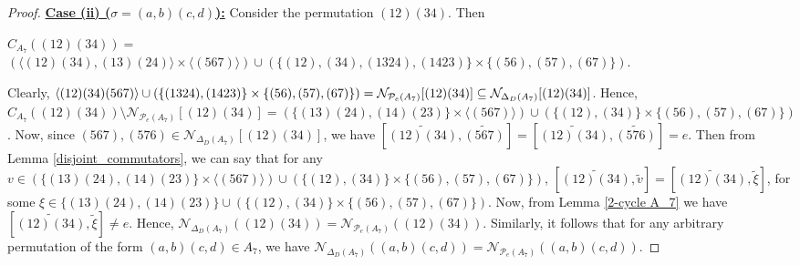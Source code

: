 \documentclass[10pt,a4paper]{amsart}
\begin{document}
\begin{proof}
\vspace{.3cm}
\noindent\underline{\bf{Case (ii) ($\sigma=(a,b)(c,d)$):}} Consider the permutation $(12)(34)$. Then
\begin{center}
$C_{A_7}((12)(34))=$\\
$(\langle (12)(34),(13)(24)\rangle\times\langle (567)\rangle)\cup(\{(12),(34),(1324),(1423)\}\times\{(56),(57),(67)\}).$   
\end{center}
\vspace{.15cm}
Clearly, $\langle(12)(34)(567)\rangle\cup(\{(1324),(1423)\}\times\{(56),(57),(67)\})=\mathcal{N}_{\mathcal{P}_e(A_7)}[(12)(34)]\subseteq \\ \mathcal{N}_{\Delta_D(A_7)}[(12)(34)]$. Hence, $C_{A_7}((12)(34))\setminus\mathcal{N}_{\mathcal{P}_e(A_7)}[(12)(34)]=(\{(13)(24),(14)(23)\}\times\langle(567)\rangle)\cup(\{(12),(34)\}\times\{(56),(57),(67)\})$. Now, since $(567),(576)\in\mathcal{N}_{\Delta_D(A_7)}[(12)(34)]$, we have $[\tilde{(12)(34)},\tilde{(567)}]=[\tilde{(12)(34)},\tilde{(576)}]=e$. Then from Lemma \ref{disjoint_commutators}, we can say that for any $v\in (\{(13)(24),(14)(23)\}\times\langle(567)\rangle)\cup(\{(12),(34)\}\times\{(56),(57),(67)\})$, $[\tilde{(12)(34)},\tilde{v}]=[\tilde{(12)(34)},\tilde{\xi}]$, for some $\xi\in\{(13)(24),(14)(23)\}\cup(\{(12),(34)\}\times\{(56),(57),(67)\})$. Now, from Lemma \ref{2-cycle A_7} we have $[\tilde{(12)(34)},\tilde{\xi}]\neq e$. Hence, $\mathcal{N}_{\Delta_D(A_7)}((12)(34))=\mathcal{N}_{\mathcal{P}_e(A_7)}((12)(34))$. Similarly, it follows that for any arbitrary permutation of the form $(a,b)(c,d)\in A_7$, we have $\mathcal{N}_{\Delta_D(A_7)}((a,b)(c,d))=\mathcal{N}_{\mathcal{P}_e(A_7)}((a,b)(c,d))$.  


\end{proof}
\end{document}

